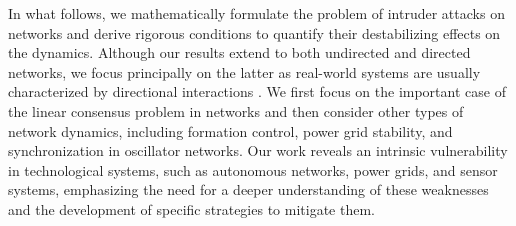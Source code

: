 \documentclass[%
 reprint,
 amsmath,amssymb,
 aip,
]{revtex4-2}
\theoremstyle{italichead}
\theoremstyle{definition}
\begin{document}
{{In what follows, we mathematically formulate the problem of intruder attacks on networks and derive rigorous conditions to quantify their destabilizing effects on the dynamics. {Although our results extend to both undirected and directed networks, we focus principally on the latter as real-world systems are usually characterized by directional interactions \cite{Asllani2018Structure, o2021hierarchical, Ramon, johnson2020digraphs}.} We first focus on the important case of the linear consensus problem in networks and then consider other types of network dynamics, including formation control, power grid stability, and synchronization in oscillator networks. Our work reveals an intrinsic vulnerability in technological systems, such as autonomous networks, power grids, and sensor systems, emphasizing the need for a deeper understanding of these weaknesses and the development of specific strategies to mitigate them.}


}
\end{document}
